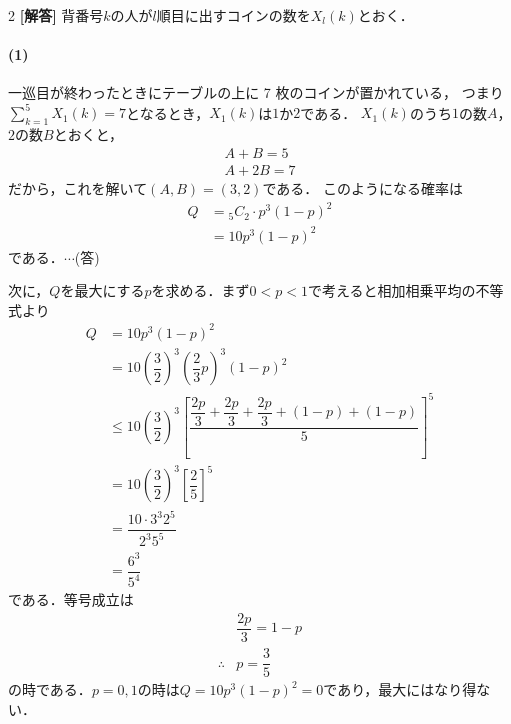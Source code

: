 \documentclass[../../main.tex]{subfiles}
\begin{document}
\setcounter{equation}{0}
\begin{oframed}
  
\end{oframed}
\setlength{\columnseprule}{0.4pt}
\begin{multicols}{2}
  {\bf [解答]}
  背番号$k$の人が$l$順目に出すコインの数を$X_l(k)$とおく．
  \paragraph{(1)}
  一巡目が終わったときにテーブルの上に 7 枚のコインが置かれている，
  つまり$\sum_{k=1}^{5}X_1(k)=7$となるとき，$X_1(k)$は$1$か$2$である．
  $X_{1}(k)$のうち$1$の数$A$，$2$の数$B$とおくと，
  \begin{align}
    A + B = 5 \\
    A + 2B = 7
  \end{align}
  だから，これを解いて$(A,B)=(3,2)$である．
  このようになる確率は
  \begin{align}
    Q
    & = {}_5C_2 \cdot p^3 (1-p)^2 \\
    & = 10p^3(1-p)^2
  \end{align}
  である．$\cdots$(答)

  次に，$Q$を最大にする$p$を求める．まず$0<p<1$で考えると相加相乗平均の不等式より
  \begin{align}
    Q
    & = 10p^3(1-p)^2                                                                                               \\
    & = 10\left(\dfrac{3}{2}\right)^3\left(\dfrac{2}{3}p\right)^3(1-p)^2                                             \\
    & \le 10\left(\dfrac{3}{2}\right)^3 \left[\dfrac{\dfrac{2p}{3}+\dfrac{2p}{3}+\dfrac{2p}{3}+(1-p)+(1-p)}{5}\right]^5 \\
    & = 10\left(\dfrac{3}{2}\right)^3 \left[\dfrac{2}{5}\right]^5                                                    \\
    & = \dfrac{10\cdot 3^3 2^5}{2^3 5^5}                                                                            \\
    & = \dfrac{6^3}{5^4}
  \end{align}
  である．等号成立は
  \begin{align}
    & \dfrac{2p}{3} = 1- p \\
    \therefore
    & p = \dfrac{3}{5}
  \end{align}
  の時である．$p=0,1$の時は$Q=10p^3(1-p)^2=0$であり，最大にはなり得ない．


\end{multicols}
\end{document}

